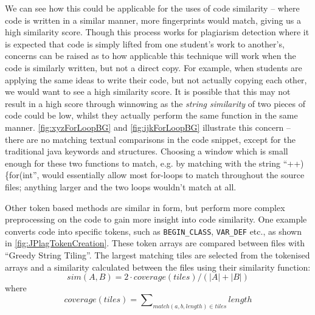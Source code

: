 We can see how this could be applicable for the uses of code similarity -- 
where code is written in a similar manner, more fingerprints would match,
giving us a high similarity score. Though this process works for plagiarism detection
where it is expected that code is simply lifted from one student's work to
another's, concerns can be raised as to how applicable this technique will work
when the code is similarly written, but not a direct copy. For example, when 
students are applying the same ideas to write their code, but not actually
copying each other, we would want to see a high similarity score. It is possible
that this may not result in a high score through winnowing as the \emph{string
similarity} of two pieces of code could be low, whilst they actually perform
the same function in the same manner. \cref{fig:xyzForLoopBG} and
\cref{fig:ijkForLoopBG} illustrate this concern -- there are no matching
textual comparisons in the code snippet, except for the traditional java
keywords and structures. Choosing a window which is small enough for
these two functions to match, e.g. by matching with the string 
``++)\{for(int'', would essentially allow most for-loops to match throughout
the source files; anything larger and the two loops wouldn't match at all.

Other token based methods are similar in form, but perform
more complex preprocessing on the code to gain more insight into code similarity.
One example converts code into specific tokens, such as \texttt{BEGIN\_CLASS}, \texttt{VAR\_DEF}
etc., as shown in \cref{fig:JPlagTokenCreation}. These token arrays are 
compared between files with ``Greedy String Tiling''\cite{GreedyStringTiling}.
The largest matching tiles are selected from the tokenised arrays and a similarity
calculated between the files using their similarity function:
\[sim(A,B) = 2 \cdot
coverage(tiles)/(|A| + |B|)\] where \[coverage(tiles) =
\sum\nolimits_{match(a,b,length) \in tiles}length\]
\cite{JPlag}

